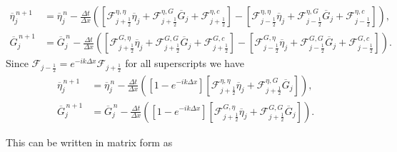\begin{align*}
\overline{\eta}_{j}^{\,n + 1} &=  \overline{\eta}^{\,n }_{j} - \frac{\Delta t}{\Delta x}  \left( \left[\mathcal{F}_{j+\frac{1}{2}} ^{\eta,\eta} \overline{\eta}_j  + \mathcal{F}_{j+\frac{1}{2}} ^{\eta,G} \overline{G}_j + \mathcal{F}_{j+\frac{1}{2}} ^{\eta,c} \right] - \left[\mathcal{F}^{\eta,\eta}_{j-\frac{1}{2}}  \overline{\eta}_{j}  + \mathcal{F}^{\eta,G}_{j-\frac{1}{2}} \overline{G}_{j} + \mathcal{F}^{\eta,c}_{j-\frac{1}{2}} \right]  \right), \\
 \overline{G}^{\,n + 1}_{j} &= \overline{G}^{\,n }_{j} -\frac{\Delta t}{\Delta x}  \left( \left[  \mathcal{F}_{j+\frac{1}{2}} ^{G,\eta} \overline{\eta}_{j}  + \mathcal{F}_{j+\frac{1}{2}} ^{G,G} \overline{G}_j + \mathcal{F}_{j+\frac{1}{2}} ^{G,c} \right] - \left[  \mathcal{F}_{j-\frac{1}{2}}^{G,\eta} \overline{\eta}_{j}  + \mathcal{F}^{G,G}_{j-\frac{1}{2}} \overline{G}_{j} + \mathcal{F}^{G,c}_{j-\frac{1}{2}} \right] \right).
\end{align*}
Since $\mathcal{F}_{j-\frac{1}{2}} = e^{-ik\Delta x} \mathcal{F}_{j+\frac{1}{2}}$ for all superscripts we have
\begin{align*}
\overline{\eta}_{j}^{\,n + 1} &=  \overline{\eta}^{\,n }_{j} - \frac{\Delta t}{\Delta x}  \left(  \left[1 - e^{-ik\Delta x}\right] \left[\mathcal{F}_{j+\frac{1}{2}}^{\eta,\eta} \overline{\eta}_j  + \mathcal{F}_{j+\frac{1}{2}}^{\eta,G} \overline{G}_j \right] \right), \\
\overline{G}^{\,n + 1}_{j} &= \overline{G}^{\,n }_{j} -\frac{\Delta t}{\Delta x}  \left( \left[1 - e^{-ik\Delta x}\right]\left[  \mathcal{F}_{j+\frac{1}{2}}^{G,\eta} \overline{\eta}_{j}  + \mathcal{F}_{j+\frac{1}{2}}^{G,G} \overline{G}_j \right] \right).
\end{align*}


This can be written in matrix form as


